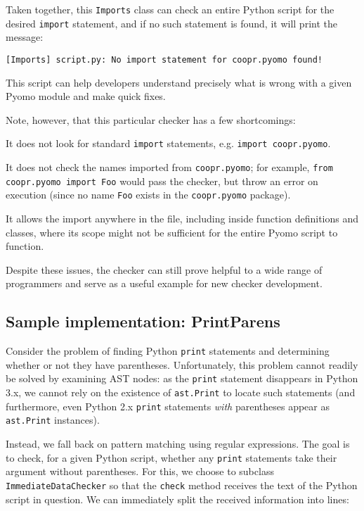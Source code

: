 \documentclass{article}
\begin{document}
Taken together, this \verb!Imports! class can check an entire Python script for the desired \verb!import! statement, and if no such statement is found, it will print the message:

\begin{verbatim}
[Imports] script.py: No import statement for coopr.pyomo found!
\end{verbatim}

This script can help developers understand precisely what is wrong with a given Pyomo module and make quick fixes.

Note, however, that this particular checker has a few shortcomings:

\begin{enumerate*}
\item It does not look for standard \verb!import! statements, e.g. \verb!import coopr.pyomo!.
\item It does not check the names imported from \verb!coopr.pyomo!; for example, \verb!from coopr.pyomo import Foo! would pass the checker, but throw an error on execution (since no name \verb!Foo! exists in the \verb!coopr.pyomo! package).
\item It allows the import anywhere in the file, including inside function definitions and classes, where its scope might not be sufficient for the entire Pyomo script to function.
\end{enumerate*}

Despite these issues, the checker can still prove helpful to a wide range of programmers and serve as a useful example for new checker development.

\subsection*{Sample implementation: PrintParens}
Consider the problem of finding Python \verb!print! statements and determining whether or not they have parentheses. Unfortunately, this problem cannot readily be solved by examining AST nodes: as the \verb!print! statement disappears in Python 3.x, we cannot rely on the existence of \verb!ast.Print! to locate such statements (and furthermore, even Python 2.x \verb!print! statements \textit{with} parentheses appear as \verb!ast.Print! instances).

Instead, we fall back on pattern matching using regular expressions. The goal is to check, for a given Python script, whether any \verb!print! statements take their argument without parentheses. For this, we choose to subclass \verb!ImmediateDataChecker! so that the \verb!check! method receives the text of the Python script in question. We can immediately split the received information into lines:
\end{document}
